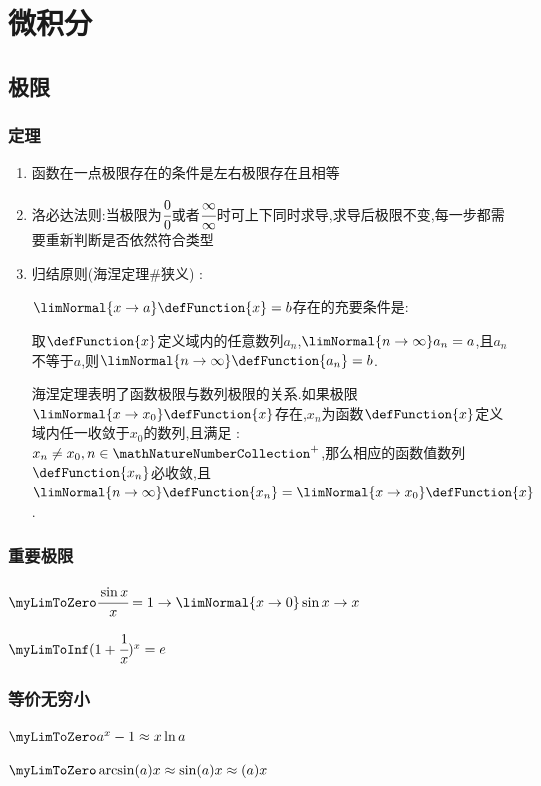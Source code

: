 \chapter{微积分}{

\section{极限}{

  \subsection{定理}{
    \begin{enumerate}
      \item 函数在一点极限存在的条件是左右极限存在且相等
      \item 洛必达法则:当极限为$\cfrac{0}{0}$或者$\cfrac{\infty}{\infty}$时可上下同时求导,求导后极限不变,每一步都需要重新判断是否依然符合类型
      \item {
            归结原则(海涅定理\#狭义) :

            $\limNormal{x \to a}\defFunction{x} = b$存在的充要条件是:

            取$\defFunction{x}$定义域内的任意数列${a_n}$,$\limNormal{n \to \infty}a_n = a$,且$a_n$不等于$a$,则$\limNormal{n \to \infty}\defFunction{a_n} = b$.

            海涅定理表明了函数极限与数列极限的关系.如果极限$\limNormal{x \to x_0}\defFunction{x}$存在,${x_n}$为函数$\defFunction{x}$定义域内任一收敛于$x_0$的数列,且满足 : $x_n \neq x_0,n \in \mathNatureNumberCollection^+$,那么相应的函数值数列${\defFunction{x_n}}$必收敛,且$\limNormal{n \to \infty}\defFunction{x_n} = \limNormal{x \to x_0}\defFunction{x}$.
            }
    \end{enumerate}
  }%

  \subsection{重要极限}{
    $\myLimToZero\cfrac{\sin{x}}{x}=1 \to \limNormal{x \to 0}\sin{x} \to x$

    $\myLimToInf(1+\cfrac{1}{x})^x = e$
  }%

  \subsection{等价无穷小}{
    $\myLimToZero a^x - 1 \approx x\ln{a}$

    $\myLimToZero \arcsin(a)x \approx \sin(a)x \approx (a)x$

}}}
